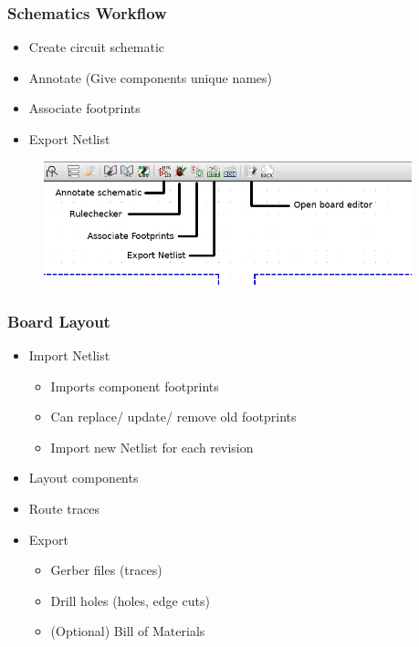 \documentclass{beamer}
\begin{document}
\begin{frame}
  \frametitle{Schematics Workflow}
  \begin{itemize}
    \item Create circuit schematic
    \item Annotate (Give components unique names)
    \item Associate footprints
    \item Export Netlist
  \end{itemize}

  \begin{figure}[H]
    \centering
    \includegraphics[width=0.95\textwidth]{images/kicad_schematic_workflow.png}
  \end{figure}
\end{frame}


\begin{frame}
  \frametitle{Board Layout}
  \begin{itemize}
    \item Import Netlist
    \begin{itemize}
      \item Imports component footprints
      \item Can replace/ update/ remove old footprints
      \item Import new Netlist for each revision
    \end{itemize}
    \item Layout components
    \item Route traces
    \item Export
    \begin{itemize}
      \item Gerber files (traces)
      \item Drill holes (holes, edge cuts)
      \item (Optional) Bill of Materials
    \end{itemize}
  \end{itemize}
\end{frame}
\end{document}

